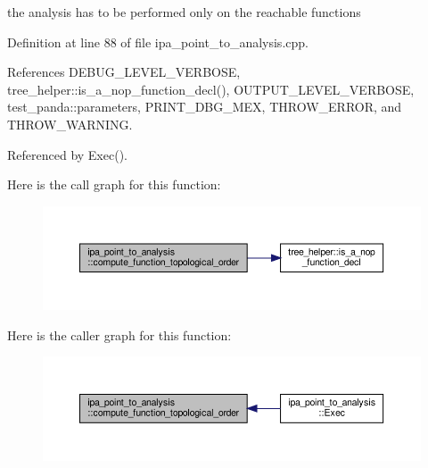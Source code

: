 the analysis has to be performed only on the reachable functions 

Definition at line 88 of file ipa\+\_\+point\+\_\+to\+\_\+analysis.\+cpp.



References D\+E\+B\+U\+G\+\_\+\+L\+E\+V\+E\+L\+\_\+\+V\+E\+R\+B\+O\+SE, tree\+\_\+helper\+::is\+\_\+a\+\_\+nop\+\_\+function\+\_\+decl(), O\+U\+T\+P\+U\+T\+\_\+\+L\+E\+V\+E\+L\+\_\+\+V\+E\+R\+B\+O\+SE, test\+\_\+panda\+::parameters, P\+R\+I\+N\+T\+\_\+\+D\+B\+G\+\_\+\+M\+EX, T\+H\+R\+O\+W\+\_\+\+E\+R\+R\+OR, and T\+H\+R\+O\+W\+\_\+\+W\+A\+R\+N\+I\+NG.



Referenced by Exec().

Here is the call graph for this function\+:
\nopagebreak
\begin{figure}[H]
\begin{center}
\leavevmode
\includegraphics[width=350pt]{d6/d2c/classipa__point__to__analysis_af0c17eb410da57bdc9a4e17dca79ef34_cgraph}
\end{center}
\end{figure}
Here is the caller graph for this function\+:
\nopagebreak
\begin{figure}[H]
\begin{center}
\leavevmode
\includegraphics[width=350pt]{d6/d2c/classipa__point__to__analysis_af0c17eb410da57bdc9a4e17dca79ef34_icgraph}
\end{center}
\end{figure}
\mbox{\label{classipa__point__to__analysis_a91ec321eddd93d5d46d084d7c37d74b7}} 
